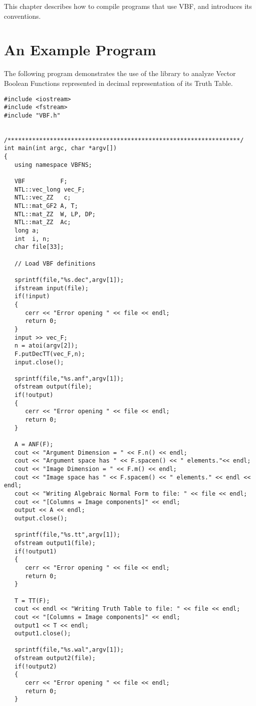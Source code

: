 This chapter describes how to compile programs that use VBF, and introduces its conventions.

\section{An Example Program}\label{sec:Example}

The following program demonstrates the use of the library to analyze Vector Boolean Functions represented in decimal representation of its Truth Table.

\begin{verbatim}
#include <iostream>
#include <fstream>
#include "VBF.h"


/******************************************************************/
int main(int argc, char *argv[])
{
   using namespace VBFNS;

   VBF          F;
   NTL::vec_long vec_F;
   NTL::vec_ZZ   c;
   NTL::mat_GF2 A, T;
   NTL::mat_ZZ  W, LP, DP;
   NTL::mat_ZZ  Ac;
   long a;
   int  i, n;
   char file[33];

   // Load VBF definitions

   sprintf(file,"%s.dec",argv[1]);
   ifstream input(file);
   if(!input)
   {
      cerr << "Error opening " << file << endl;
      return 0;
   }
   input >> vec_F;
   n = atoi(argv[2]);
   F.putDecTT(vec_F,n);
   input.close();

   sprintf(file,"%s.anf",argv[1]);
   ofstream output(file);
   if(!output)
   {
      cerr << "Error opening " << file << endl;
      return 0;
   }

   A = ANF(F);
   cout << "Argument Dimension = " << F.n() << endl;
   cout << "Argument space has " << F.spacen() << " elements."<< endl;
   cout << "Image Dimension = " << F.m() << endl;
   cout << "Image space has " << F.spacem() << " elements." << endl << endl;
   cout << "Writing Algebraic Normal Form to file: " << file << endl;
   cout << "[Columns = Image components]" << endl;
   output << A << endl;
   output.close();

   sprintf(file,"%s.tt",argv[1]);
   ofstream output1(file);
   if(!output1)
   {
      cerr << "Error opening " << file << endl;
      return 0;
   }

   T = TT(F);
   cout << endl << "Writing Truth Table to file: " << file << endl;
   cout << "[Columns = Image components]" << endl;
   output1 << T << endl;
   output1.close();

   sprintf(file,"%s.wal",argv[1]);
   ofstream output2(file);
   if(!output2)
   {
      cerr << "Error opening " << file << endl;
      return 0;
   }


\end{verbatim}
